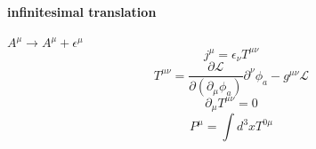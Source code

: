 \documentclass{article}
\begin{document}
\paragraph{infinitesimal translation}
$A^{\mu} \to A^{\mu}+\epsilon^{\mu}$
\begin{equation}
j^{\mu}=\epsilon_{\nu}T^{\mu \nu}
\end{equation}
\begin{equation}
T^{\mu \nu}=\frac{\partial\mathcal{L}}{\partial(\partial_{\mu}\phi_{a})}\partial^{\nu}\phi_{a}-g^{\mu\nu}\mathcal{L}
\end{equation}
\begin{equation}
\partial_{\mu} T^{\mu\nu}=0
\end{equation}
\begin{equation}
P^{\mu}=\int d^3x T^{0\mu}
\end{equation}
\end{document}
